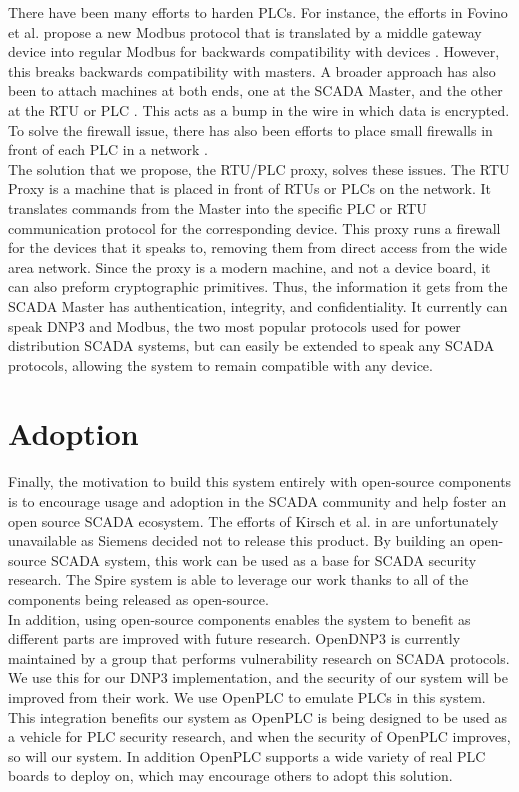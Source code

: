 \documentclass[oneside,11pt,a4paper,oldfontcommands]{book}
\begin{document}
There have been many efforts to harden PLCs. For instance,  the efforts in 
Fovino et al. propose a new Modbus protocol that is translated
by a middle gateway device into regular Modbus for backwards compatibility 
with devices \cite{SecureModbus}. However, this breaks backwards compatibility
 with masters. A broader approach has also been to attach  machines at
both ends, one at the SCADA Master, and the other at the RTU or PLC
\cite{SCADANetworks}. This acts as a bump in the wire
in which data is encrypted. To solve the firewall issue, there
has also been efforts to place small firewalls in front of each PLC in a network
\cite{SCADANetworks}. \\

The solution that we propose, the RTU/PLC proxy, solves these issues. The RTU Proxy is a 
machine that is placed in front of RTUs or PLCs on the network. It
translates commands from the Master into the specific PLC or RTU communication 
protocol for the corresponding device. This proxy runs a firewall for the devices
that it speaks to, removing them from direct access from the wide area network. Since
the proxy is a modern machine, and not a device board, it can also preform cryptographic
primitives. Thus, the information it gets from the SCADA Master has authentication, 
integrity, and confidentiality. It currently can speak DNP3 and Modbus, the two most
popular protocols used for power distribution SCADA systems, but can easily be
extended to speak any SCADA protocols, allowing the system to remain compatible with
any device.\\

\section{Adoption}

\indent \indent
Finally, the motivation to build this system entirely with open-source components is
to encourage usage and adoption in the SCADA community and help foster
an open source SCADA ecosystem. The efforts of Kirsch et al. in
\cite{SurvivableSCADA} are unfortunately unavailable
as Siemens decided not to release this product. By building an open-source
SCADA system, this work can be used as a base for SCADA security research.
The Spire system is able to leverage our work thanks to all of the components
being released as open-source.\\

\indent 
In addition, using open-source components enables the system to benefit as
different parts are improved with future research. OpenDNP3 \cite{OpenDNP3}
is currently maintained by a group that performs vulnerability research on SCADA
protocols. We use this for our DNP3 implementation, and the security of our
system will be improved from their work. We use OpenPLC \cite{OpenPLC} to emulate PLCs 
in this system. This integration benefits our system as OpenPLC is being designed to
be used as a vehicle for PLC security research, and when the security of OpenPLC improves,
so will our system. In addition OpenPLC supports a wide variety of real PLC
boards to deploy on, which may encourage others to adopt this solution.\\
\end{document}

